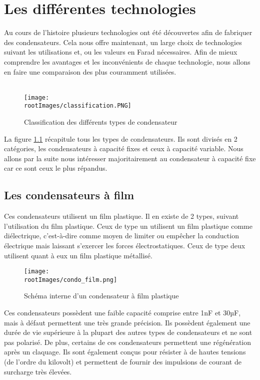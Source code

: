\chapter{Les différentes technologies}

Au cours de l’histoire plusieurs technologies ont été découvertes afin de fabriquer des condensateurs. Cela nous offre maintenant, un large choix de technologies suivant les utilisations et, ou les valeurs en Farad nécessaires. Afin de mieux comprendre les avantages et les inconvénients de chaque technologie, nous allons en faire une comparaison des plus couramment utilisées. \\ \\

\begin{figure}[!h]
    \centering
    \texttt{[image: \\rootImages/classification.PNG]}
    \caption{Classification des différents types de condensateur}
    \label{classification}
\end{figure}

La figure \ref{classification} récapitule tous les types de condensateurs. Ils sont divisés en 2 catégories, les condensateurs à capacité fixes et ceux à capacité variable. Nous allons par la suite nous intéresser majoritairement au condensateur à capacité fixe car ce sont ceux le plus répandus.

\section{Les condensateurs à film}


Ces condensateurs utilisent un film plastique. Il en existe de 2 types, suivant l’utilisation du film plastique.  Ceux de type un utilisent un film plastique comme diélectrique, c’est-à-dire comme moyen de limiter ou empêcher la conduction électrique mais laissant s’exercer les forces électrostatiques. Ceux de type deux utilisent quant à eux un film plastique métallisé. \\


\begin{figure}[!h]
    \centering
    \texttt{[image: \\rootImages/condo\_film.png]}
    \caption{Schéma interne d'un condensateur à film plastique}
\end{figure}

Ces condensateurs possèdent une faible capacité comprise entre 1nF et 30µF, mais à défaut permettent une très grande précision. Ils possèdent également une durée de vie supérieure à la plupart des autres types de condensateurs et ne sont pas polarisé. De plus, certains de ces condensateurs permettent une régénération après un claquage. Ils sont également conçus pour résister à de hautes tensions (de l’ordre du kilovolt) et permettent de fournir des impulsions de courant de surcharge très élevées.


